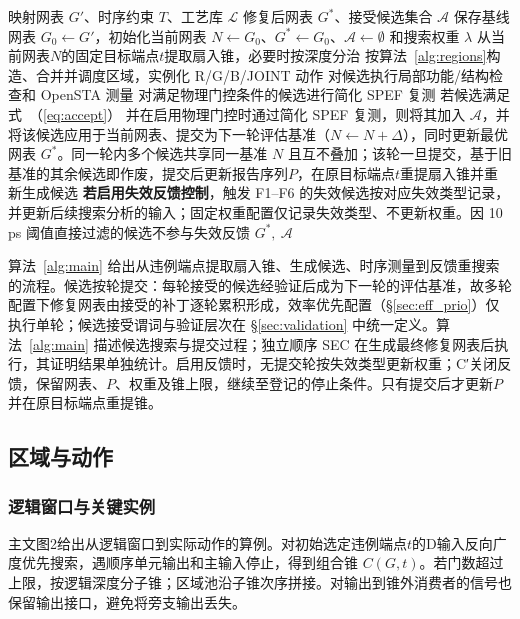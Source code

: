 \documentclass[twocolumn,10pt,fontset=windows]{ctexart}
\renewcommand{\eqref}[1]{\textup{（\ref{#1}）}}
\begin{document}
\begin{algorithm}[H]
\footnotesize
\caption{FAECO 修复流程示意}\label{alg:main}
\begin{algorithmic}[1]
\Require 映射网表 $G'$、时序约束 $T$、工艺库 $\mathcal{L}$
\Ensure 修复后网表 $G^*$、接受候选集合 $\mathcal{A}$
\State 保存基线网表 $G_0\gets G'$，初始化当前网表 $N\gets G_0$、$G^*\gets G_0$、$\mathcal{A}\gets\emptyset$ 和搜索权重 $\lambda$
\Repeat
  \State 从当前网表$N$的固定目标端点$t$提取扇入锥，必要时按深度分治
  \State 按算法~\ref{alg:regions}构造、合并并调度区域，实例化 R/G/B/JOINT 动作
  \State 对候选执行局部功能/结构检查和 OpenSTA 测量
  \State 对满足物理门控条件的候选进行简化 SPEF 复测
  \State 若候选满足式~\eqref{eq:accept} 并在启用物理门控时通过简化 SPEF 复测，则将其加入 $\mathcal{A}$，并将该候选应用于当前网表、提交为下一轮评估基准（$N\gets N+\Delta$），同时更新最优网表 $G^*$。同一轮内多个候选共享同一基准 $N$ 且互不叠加；该轮一旦提交，基于旧基准的其余候选即作废，提交后更新报告序列$P$，在原目标端点$t$重提扇入锥并重新生成候选
  \State \textbf{若启用失效反馈控制}，触发 F1--F6 的失效候选按对应失效类型记录，并更新后续搜索分析的输入；固定权重配置仅记录失效类型、不更新权重。因 10\,ps 阈值直接过滤的候选不参与失效反馈
\State \Return $G^*,\ \mathcal{A}$
\end{algorithmic}
\end{algorithm}

算法~\ref{alg:main} 给出从违例端点提取扇入锥、生成候选、时序测量到反馈重搜索的流程。候选按轮提交：每轮接受的候选经验证后成为下一轮的评估基准，故多轮配置下修复网表由接受的补丁逐轮累积形成，效率优先配置（\S\ref{sec:eff_prio}）仅执行单轮；候选接受谓词与验证层次在 \S\ref{sec:validation} 中统一定义。算法~\ref{alg:main} 描述候选搜索与提交过程；独立顺序 SEC 在生成最终修复网表后执行，其证明结果单独统计。启用反馈时，无提交轮按失效类型更新权重；C′关闭反馈，保留网表、$P$、权重及锥上限，继续至登记的停止条件。只有提交后才更新$P$并在原目标端点重提锥。

\subsection{区域与动作}\label{sec:mechanism}
\subsubsection{逻辑窗口与关键实例}
主文图2给出从逻辑窗口到实际动作的算例。对初始选定违例端点$t$的D输入反向广度优先搜索，遇顺序单元输出和主输入停止，得到组合锥 $C(G,t)$。若门数超过上限，按逻辑深度分子锥；区域池沿子锥次序拼接。对输出到锥外消费者的信号也保留输出接口，避免将旁支输出丢失。
\end{document}
